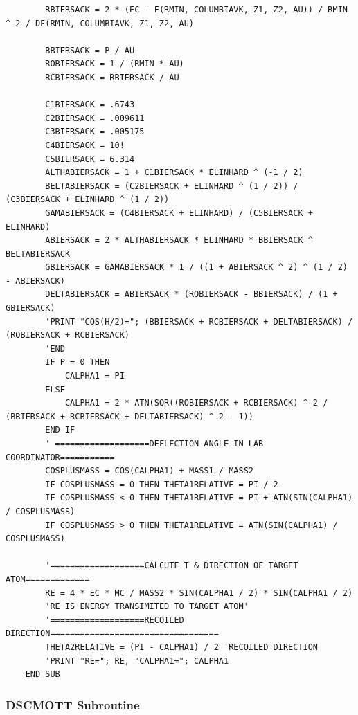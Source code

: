 \documentclass[10pt, reqno]{exam}
\begin{document}
\begin{verbatim}
        RBIERSACK = 2 * (EC - F(RMIN, COLUMBIAVK, Z1, Z2, AU)) / RMIN ^ 2 / DF(RMIN, COLUMBIAVK, Z1, Z2, AU)
    
        BBIERSACK = P / AU
        ROBIERSACK = 1 / (RMIN * AU)
        RCBIERSACK = RBIERSACK / AU
    
        C1BIERSACK = .6743
        C2BIERSACK = .009611
        C3BIERSACK = .005175
        C4BIERSACK = 10!
        C5BIERSACK = 6.314
        ALTHABIERSACK = 1 + C1BIERSACK * ELINHARD ^ (-1 / 2)
        BELTABIERSACK = (C2BIERSACK + ELINHARD ^ (1 / 2)) / (C3BIERSACK + ELINHARD ^ (1 / 2))
        GAMABIERSACK = (C4BIERSACK + ELINHARD) / (C5BIERSACK + ELINHARD)
        ABIERSACK = 2 * ALTHABIERSACK * ELINHARD * BBIERSACK ^ BELTABIERSACK
        GBIERSACK = GAMABIERSACK * 1 / ((1 + ABIERSACK ^ 2) ^ (1 / 2) - ABIERSACK)
        DELTABIERSACK = ABIERSACK * (ROBIERSACK - BBIERSACK) / (1 + GBIERSACK)
        'PRINT "COS(H/2)="; (BBIERSACK + RCBIERSACK + DELTABIERSACK) / (ROBIERSACK + RCBIERSACK)
        'END
        IF P = 0 THEN
            CALPHA1 = PI
        ELSE
            CALPHA1 = 2 * ATN(SQR((ROBIERSACK + RCBIERSACK) ^ 2 / (BBIERSACK + RCBIERSACK + DELTABIERSACK) ^ 2 - 1))
        END IF
        ' ===================DEFLECTION ANGLE IN LAB COORDINATOR===========
        COSPLUSMASS = COS(CALPHA1) + MASS1 / MASS2
        IF COSPLUSMASS = 0 THEN THETA1RELATIVE = PI / 2
        IF COSPLUSMASS < 0 THEN THETA1RELATIVE = PI + ATN(SIN(CALPHA1) / COSPLUSMASS)
        IF COSPLUSMASS > 0 THEN THETA1RELATIVE = ATN(SIN(CALPHA1) / COSPLUSMASS)
    
        '===================CALCUTE T & DIRECTION OF TARGET ATOM=============
        RE = 4 * EC * MC / MASS2 * SIN(CALPHA1 / 2) * SIN(CALPHA1 / 2)
        'RE IS ENERGY TRANSIMITED TO TARGET ATOM'
        '===================RECOILED DIRECTION==================================
        THETA2RELATIVE = (PI - CALPHA1) / 2 'RECOILED DIRECTION
        'PRINT "RE="; RE, "CALPHA1="; CALPHA1
    END SUB
\end{verbatim}

\subsubsection{DSCMOTT Subroutine}
\end{document}

